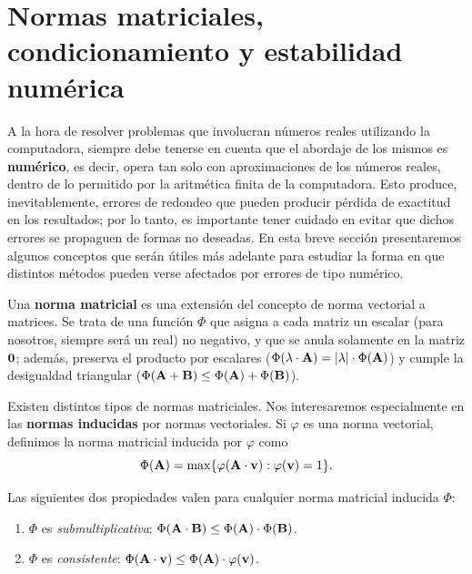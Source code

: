 
\section{Normas matriciales, condicionamiento y estabilidad numérica}
\label{section:estabilidad}

A la hora de resolver problemas que involucran números reales utilizando la
computadora, siempre debe tenerse en cuenta que el abordaje de los mismos es
\textbf{numérico}, es decir, opera tan solo con aproximaciones de los números
reales, dentro de lo permitido por la aritmética finita de la computadora.
Esto produce, inevitablemente, errores de redondeo que pueden producir pérdida
de exactitud en los resultados; por lo tanto, es importante tener cuidado en
evitar que dichos errores se propaguen de formas no deseadas.
En esta breve sección presentaremos algunos conceptos que serán útiles más
adelante para estudiar la forma en que distintos métodos pueden verse
afectados por errores de tipo numérico.

Una \textbf{norma matricial} es una extensión del concepto de norma vectorial
a matrices. Se trata de una función $\Phi$ que asigna a cada matriz un escalar
(para nosotros, siempre será un real) no negativo, y que se anula solamente en
la matriz $\mathbf{0}$; además, preserva el producto por escalares ($\Phi(
\lambda \cdot \mathbf{A}) = \lvert \lambda \rvert \cdot \Phi(\mathbf{A})$) y cumple
la desigualdad triangular ($\Phi(\mathbf{A} + \mathbf{B}) \leq \Phi(\mathbf{A}) +
\Phi(\mathbf{B})$).

Existen distintos tipos de normas matriciales. Nos interesaremos especialmente
en las \textbf{normas inducidas} por normas vectoriales. Si $\varphi$ es una
norma vectorial, definimos la norma matricial inducida por $\varphi$ como
\[ \Phi(\mathbf{A}) =
    \max \{ \varphi(\mathbf{A} \cdot \mathbf{v}) : \varphi(\mathbf{v}) = 1 \}. \]

Las siguientes dos propiedades valen para cualquier norma matricial inducida
$\Phi$:
\begin{enumerate}[label=(\roman*)]
\item $\Phi$ es \emph{submultiplicativa}: $\Phi(\mathbf{A} \cdot \mathbf{B}) \leq
    \Phi({\mathbf{A}}) \cdot \Phi(\mathbf{B})$.
\item $\Phi$ es \emph{consistente}: $\Phi(\mathbf{A} \cdot \mathbf{v}) \leq
    \Phi(\mathbf{A}) \cdot \varphi(\mathbf{v})$.
\end{enumerate}

